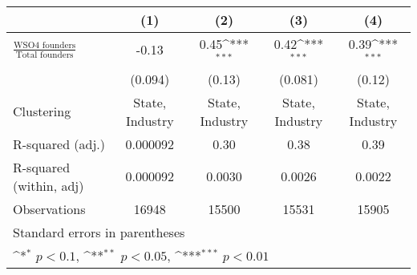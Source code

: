 {
\def\sym#1{\ifmmode^{#1}\else\(^{#1}\)\fi}
\begin{tabular}{l*{4}{c}}
\toprule
                    &\multicolumn{1}{c}{(1)}         &\multicolumn{1}{c}{(2)}         &\multicolumn{1}{c}{(3)}         &\multicolumn{1}{c}{(4)}         \\
\midrule
$\frac{\text{WSO4 founders}}{\text{Total founders}}$&       -0.13         &        0.45\sym{***}&        0.42\sym{***}&        0.39\sym{***}\\
                    &     (0.094)         &      (0.13)         &     (0.081)         &      (0.12)         \\
\midrule
Clustering          &State, Industry         &State, Industry         &State, Industry         &State, Industry         \\
R-squared (adj.)    &    0.000092         &        0.30         &        0.38         &        0.39         \\
R-squared (within, adj)&    0.000092         &      0.0030         &      0.0026         &      0.0022         \\
Observations        &       16948         &       15500         &       15531         &       15905         \\
\bottomrule
\multicolumn{5}{l}{\tiny Standard errors in parentheses}\\
\multicolumn{5}{l}{\tiny \sym{*} \(p<0.1\), \sym{**} \(p<0.05\), \sym{***} \(p<0.01\)}\\
\end{tabular}
}
